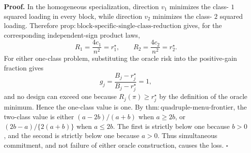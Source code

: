\textbf{Proof.}
In the homogeneous specialization, direction \(v_1\) minimizes the class-
\(1\) squared loading in every block, while direction \(v_2\) minimizes the class-
\(2\) squared loading. Therefore \(\mathrm{prop:block\text{-}specific\text{-}single\text{-}class\text{-}reduction}\) gives, for the corresponding independent-sign product laws,
\[
R_1=\frac{4c_1}{n^2}=r_1^\star,
\qquad
R_2=\frac{4c_2}{n^2}=r_2^\star.
\]
For either one-class problem, substituting the oracle risk into the positive-gain fraction gives
\[
g_j=\frac{B_j-r_j^\star}{B_j-r_j^\star}=1,
\]
and no design can exceed one because \(R_j(\pi)\ge r_j^\star\) by the definition of the oracle minimum. Hence the one-class value is one. By \(\mathrm{thm:quadruple\text{-}menu\text{-}frontier}\), the two-class value is either \((a-2b)/(a+b)\) when \(a\ge2b\), or \((2b-a)/\{2(a+b)\}\) when \(a\le2b\). The first is strictly below one because \(b>0\), and the second is strictly below one because \(a>0\). Thus simultaneous commitment, and not failure of either oracle construction, causes the loss. \(\square\)
